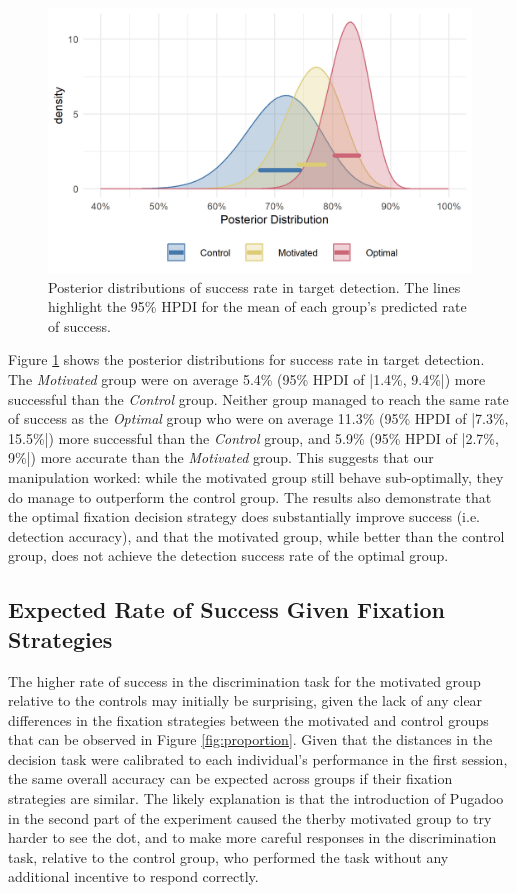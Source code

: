 \documentclass[vision,article,submit,moreauthors,pdftex,10pt,a4paper]{mdpi}
\begin{document}
\begin{figure}[H]
	\centering
	\includegraphics[width=12 cm]{../Figures/Model_stan_rawacc_pdata_hpdi.png}
	\caption{Posterior distributions of success rate in target detection. The lines highlight the 95\% HPDI for the mean of each group’s predicted rate of success. 
	}
	\label{fig:rawacc_dist}
\end{figure} 

Figure \ref{fig:rawacc_dist} shows the posterior distributions for success rate in target detection. The \textit{Motivated} group were on average 5.4\% (95\% HPDI of |1.4\%, 9.4\%|) more successful than the \textit{Control} group. Neither group managed to reach the same rate of success as the \textit{Optimal} group who were on average 11.3\% (95\% HPDI of |7.3\%, 15.5\%|) more successful than the \textit{Control} group, and 5.9\% (95\% HPDI of |2.7\%, 9\%|) more accurate than the \textit{Motivated} group. This suggests that our manipulation worked: while the motivated group still behave sub-optimally, they do manage to outperform the control group. The results also demonstrate that the optimal fixation decision strategy does substantially improve success (i.e. detection accuracy), and that the motivated group, while better than the control group, does not achieve the detection success rate of the optimal group. 

\subsection{Expected Rate of Success Given Fixation Strategies}
The higher rate of success in the discrimination task for the motivated group relative to the controls may initially be surprising, given the lack of any clear differences in the fixation strategies between the motivated and control groups that can be observed in Figure \ref{fig:proportion}. Given that the distances in the decision task were calibrated to each individual’s performance in the first session, the same overall accuracy can be expected across groups if their fixation strategies are similar. The likely explanation is that the introduction of Pugadoo in the second part of the experiment caused the therby motivated group to try harder to see the dot, and to make more careful responses in the discrimination task, relative to the control group, who performed the task without any additional incentive to respond correctly. 
\end{document}
